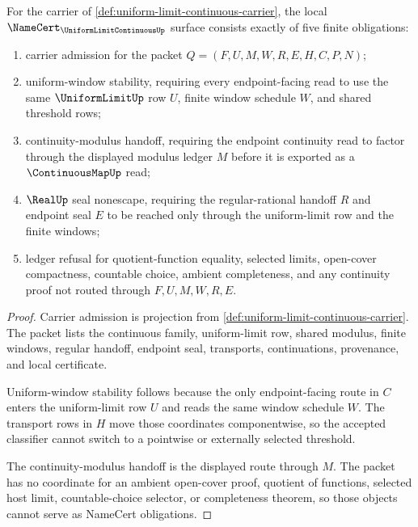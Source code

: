 \begin{theorem}
\label{thm:uniform-limit-continuous-namecert-obligations}
For the carrier of \autoref{def:uniform-limit-continuous-carrier}, the local $\NameCert_{\UniformLimitContinuousUp}$ surface consists exactly of five finite obligations:
\begin{enumerate}
\item carrier admission for the packet $Q=(F,U,M,W,R,E,H,C,P,N)$;
\item uniform-window stability, requiring every endpoint-facing read to use the same $\UniformLimitUp$ row $U$, finite window schedule $W$, and shared threshold rows;
\item continuity-modulus handoff, requiring the endpoint continuity read to factor through the displayed modulus ledger $M$ before it is exported as a $\ContinuousMapUp$ read;
\item $\RealUp$ seal nonescape, requiring the regular-rational handoff $R$ and endpoint seal $E$ to be reached only through the uniform-limit row and the finite windows;
\item ledger refusal for quotient-function equality, selected limits, open-cover compactness, countable choice, ambient completeness, and any continuity proof not routed through $F,U,M,W,R,E$.
\end{enumerate}
\end{theorem}
\begin{proof}
Carrier admission is projection from \autoref{def:uniform-limit-continuous-carrier}. The packet lists the continuous family, uniform-limit row, shared modulus, finite windows, regular handoff, endpoint seal, transports, continuations, provenance, and local certificate.

Uniform-window stability follows because the only endpoint-facing route in $C$ enters the uniform-limit row $U$ and reads the same window schedule $W$. The transport rows in $H$ move those coordinates componentwise, so the accepted classifier cannot switch to a pointwise or externally selected threshold.

The continuity-modulus handoff is the displayed route through $M$. The packet has no coordinate for an ambient open-cover proof, quotient of functions, selected host limit, countable-choice selector, or completeness theorem, so those objects cannot serve as NameCert obligations.
\end{proof}

